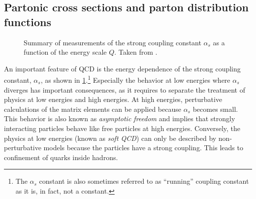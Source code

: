 \subsection{Partonic cross sections and parton distribution functions}
\label{subsec:factorisation}

\begin{figure}
  \caption[Summary of measurements of the strong coupling constant $\alpha_s$ as a function of the energy scale $Q$.]{Summary of measurements of the strong coupling constant $\alpha_s$ as a function of the energy scale $Q$. Taken from . }
  \label{fig:alphas}
\end{figure}


An important feature of QCD is the energy dependence of the strong coupling constant, $\alpha_s$, as shown in \cref{fig:alphas}.\footnote{The $\alpha_s$ constant is also sometimes referred to as ``running'' coupling constant as it is, in fact, not a constant.} Especially the behavior at low energies where $\alpha_s$ diverges has important consequences, as it requires to separate the treatment of physics at low energies and high energies. 
At high energies, perturbative calculations of the matrix elements can be applied because $\alpha_s$ becomes small. This behavior is also known as \emph{asymptotic freedom} and implies that strongly interacting particles behave like free particles at high energies. 
Conversely, the physics at low energies (known as \emph{soft QCD}) can only be described by non-perturbative models because the particles have a strong coupling. This leads to confinement of quarks inside hadrons.


